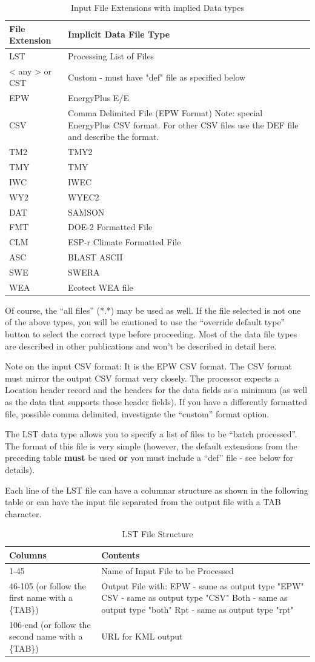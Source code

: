 \begin{longtable}[c]{p{1.5in}p{4.5in}}
\caption{Input File Extensions with implied Data types \protect \label{table:input-file-extensions-with-implied-data-types}}\\
\toprule 
File Extension & Implicit Data File Type \tabularnewline \midrule
\endhead
LST & Processing List of Files \tabularnewline
< any >  or CST & Custom - must have "def" file as specified below \tabularnewline
EPW & EnergyPlus E/E \tabularnewline
CSV & Comma Delimited File (EPW Format) Note: special EnergyPlus CSV format. For other CSV files use the DEF file and describe the format. \tabularnewline
TM2 & TMY2 \tabularnewline
TMY & TMY \tabularnewline
IWC & IWEC \tabularnewline
WY2 & WYEC2 \tabularnewline
DAT & SAMSON \tabularnewline
FMT & DOE-2 Formatted File \tabularnewline
CLM & ESP-r Climate Formatted File \tabularnewline
ASC & BLAST ASCII \tabularnewline
SWE & SWERA \tabularnewline
WEA & Ecotect WEA file \tabularnewline
\bottomrule
\end{longtable}

Of course, the ``all files'' (*.*) may be used as well. If the file selected is not one of the above types, you will be cautioned to use the ``override default type'' button to select the correct type before proceeding. Most of the data file types are described in other publications and won't be described in detail here.

Note on the input CSV format: It is the EPW CSV format. The CSV format must mirror the output CSV format very closely. The processor expects a Location header record and the headers for the data fields as a minimum (as well as the data that supports those header fields). If you have a differently formatted file, possible comma delimited, investigate the ``custom'' format option.

The LST data type allows you to specify a list of files to be ``batch processed''. The format of this file is very simple (however, the default extensions from the preceding table \textbf{must} be used \textbf{or} you must include a ``def'' file - see below for details).

Each line of the LST file can have a columnar structure as shown in the following table or can have the input file separated from the output file with a TAB character.

\begin{longtable}[c]{p{1.52in}p{4.47in}}
\caption{LST File Structure \protect \label{table:lst-file-structure}}\\
\toprule 
Columns & Contents \tabularnewline \midrule
\endhead
1-45 & Name of Input File to be Processed \tabularnewline
46-105 (or follow the first name with a \{TAB\}) & Output File with: EPW - same as output type "EPW" CSV - same as output type "CSV" Both - same as output type "both" Rpt - same as output type "rpt" \tabularnewline
106-end (or follow the second name with a \{TAB\}) & URL for KML output \tabularnewline
\bottomrule
\end{longtable}

